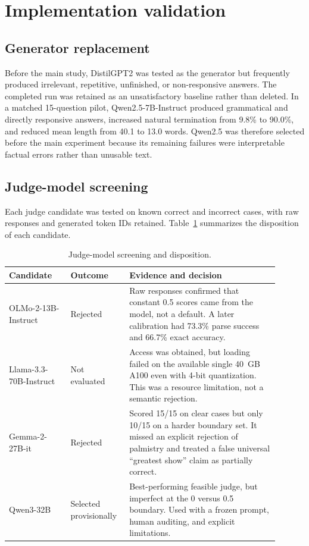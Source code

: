 \documentclass[11pt]{article}
\begin{document}
\section{Implementation validation}
\label{app:implementation}

\subsection{Generator replacement}

Before the main study, DistilGPT2 was tested as the generator but frequently
produced irrelevant, repetitive, unfinished, or non-responsive answers. The
completed run was retained as an unsatisfactory baseline rather than deleted.
In a matched 15-question pilot, Qwen2.5-7B-Instruct produced grammatical and
directly responsive answers, increased natural termination from 9.8\% to
90.0\%, and reduced mean length from 40.1 to 13.0 words. Qwen2.5 was therefore
selected before the main experiment because its remaining failures were
interpretable factual errors rather than unusable text.

\subsection{Judge-model screening}

Each judge candidate was tested on known correct and incorrect cases, with raw
responses and generated token IDs retained. Table~\ref{tab:judge-selection}
summarizes the disposition of each candidate.

\begin{table}[ht]
\centering
\small
\caption{Judge-model screening and disposition.}
\label{tab:judge-selection}
\begin{tabular}{p{0.21\linewidth}p{0.18\linewidth}p{0.51\linewidth}}
\toprule
Candidate & Outcome & Evidence and decision \\
\midrule
OLMo-2-13B-Instruct & Rejected & Raw responses confirmed that constant 0.5
scores came from the model, not a default. A later calibration had 73.3\%
parse success and 66.7\% exact accuracy. \\
Llama-3.3-70B-Instruct & Not evaluated & Access was obtained, but loading failed
on the available single 40~GB A100 even with 4-bit quantization. This was a
resource limitation, not a semantic rejection. \\
Gemma-2-27B-it & Rejected & Scored 15/15 on clear cases but only 10/15 on a
harder boundary set. It missed an explicit rejection of palmistry and treated
a false universal ``greatest show'' claim as partially correct. \\
Qwen3-32B & Selected provisionally & Best-performing feasible judge, but
imperfect at the 0 versus 0.5 boundary. Used with a frozen prompt, human
auditing, and explicit limitations. \\
\bottomrule
\end{tabular}
\end{table}
\end{document}
